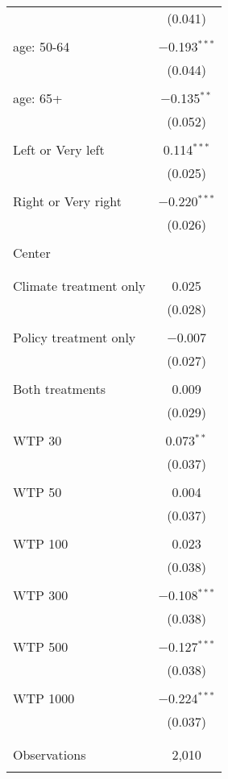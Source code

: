 \begin{tabular}{@{\extracolsep{5pt}}lc}
  & (0.041) \\ 
  & \\ 
 age: 50-64 & $-$0.193$^{***}$ \\ 
  & (0.044) \\ 
  & \\ 
 age: 65+ & $-$0.135$^{**}$ \\ 
  & (0.052) \\ 
  & \\ 
 Left or Very left & 0.114$^{***}$ \\ 
  & (0.025) \\ 
  & \\ 
 Right or Very right & $-$0.220$^{***}$ \\ 
  & (0.026) \\ 
  & \\ 
 Center &  \\ 
  &  \\ 
  & \\ 
 Climate treatment only & 0.025 \\ 
  & (0.028) \\ 
  & \\ 
 Policy treatment only & $-$0.007 \\ 
  & (0.027) \\ 
  & \\ 
 Both treatments & 0.009 \\ 
  & (0.029) \\ 
  & \\ 
 WTP 30 & 0.073$^{**}$ \\ 
  & (0.037) \\ 
  & \\ 
 WTP 50 & 0.004 \\ 
  & (0.037) \\ 
  & \\ 
 WTP 100 & 0.023 \\ 
  & (0.038) \\ 
  & \\ 
 WTP 300 & $-$0.108$^{***}$ \\ 
  & (0.038) \\ 
  & \\ 
 WTP 500 & $-$0.127$^{***}$ \\ 
  & (0.038) \\ 
  & \\ 
 WTP 1000 & $-$0.224$^{***}$ \\ 
  & (0.037) \\ 
  & \\ 
\hline \\[-1.8ex] 

Observations & 2,010 \\ 
\hline 
\hline \\[-1.8ex] 
\end{tabular} 